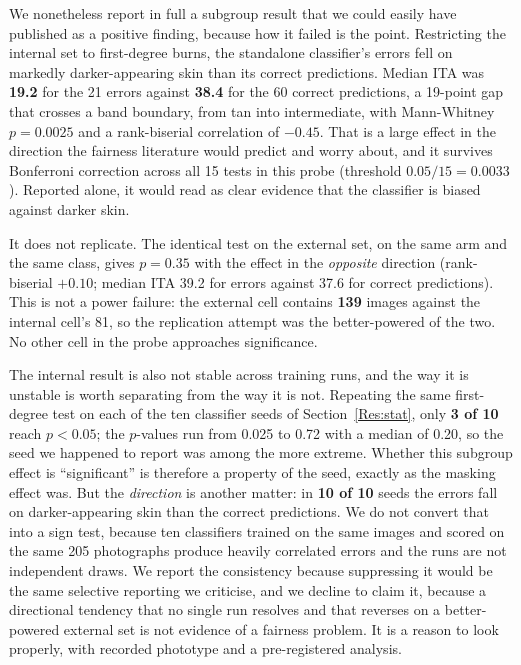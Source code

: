 \documentclass{melba}
\begin{document}
We nonetheless report in full a subgroup result that we could easily have published as a positive finding, because how it failed is the point. Restricting the internal set to first-degree burns, the standalone classifier's errors fell on markedly darker-appearing skin than its correct predictions. Median ITA was \textbf{19.2} for the 21 errors against \textbf{38.4} for the 60 correct predictions, a 19-point gap that crosses a band boundary, from tan into intermediate, with Mann-Whitney $p=\mathbf{0.0025}$ and a rank-biserial correlation of $-0.45$. That is a large effect in the direction the fairness literature would predict and worry about, and it survives Bonferroni correction across all 15 tests in this probe (threshold $0.05/15=0.0033$). Reported alone, it would read as clear evidence that the classifier is biased against darker skin.

It does not replicate. The identical test on the external set, on the same arm and the same class, gives $p=\mathbf{0.35}$ with the effect in the \emph{opposite} direction (rank-biserial $+0.10$; median ITA 39.2 for errors against 37.6 for correct predictions). This is not a power failure: the external cell contains \textbf{139} images against the internal cell's 81, so the replication attempt was the better-powered of the two. No other cell in the probe approaches significance.

The internal result is also not stable across training runs, and the way it is unstable is worth separating from the way it is not. Repeating the same first-degree test on each of the ten classifier seeds of Section~\ref{Res:stat}, only \textbf{3 of 10} reach $p<0.05$; the $p$-values run from 0.025 to 0.72 with a median of 0.20, so the seed we happened to report was among the more extreme. Whether this subgroup effect is ``significant'' is therefore a property of the seed, exactly as the masking effect was. But the \emph{direction} is another matter: in \textbf{10 of 10} seeds the errors fall on darker-appearing skin than the correct predictions. We do not convert that into a sign test, because ten classifiers trained on the same images and scored on the same 205 photographs produce heavily correlated errors and the runs are not independent draws. We report the consistency because suppressing it would be the same selective reporting we criticise, and we decline to claim it, because a directional tendency that no single run resolves and that reverses on a better-powered external set is not evidence of a fairness problem. It is a reason to look properly, with recorded phototype and a pre-registered analysis.
\end{document}
